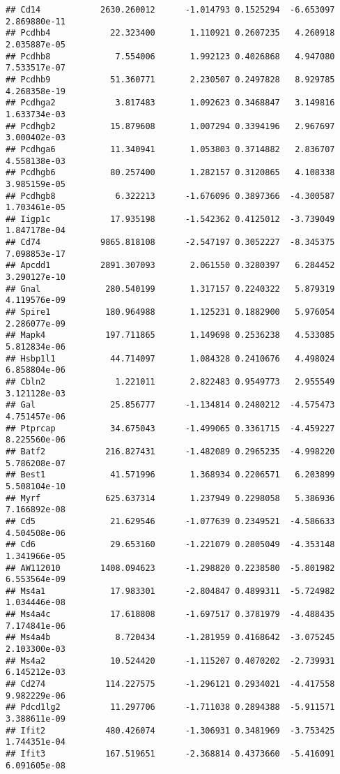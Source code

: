 \documentclass[
]{article}
\begin{document}
\begin{verbatim}
## Cd14            2630.260012      -1.014793 0.1525294  -6.653097 2.869880e-11
## Pcdhb4            22.323400       1.110921 0.2607235   4.260918 2.035887e-05
## Pcdhb8             7.554006       1.992123 0.4026868   4.947080 7.533517e-07
## Pcdhb9            51.360771       2.230507 0.2497828   8.929785 4.268358e-19
## Pcdhga2            3.817483       1.092623 0.3468847   3.149816 1.633734e-03
## Pcdhgb2           15.879608       1.007294 0.3394196   2.967697 3.000402e-03
## Pcdhga6           11.340941       1.053803 0.3714882   2.836707 4.558138e-03
## Pcdhgb6           80.257400       1.282157 0.3120865   4.108338 3.985159e-05
## Pcdhgb8            6.322213      -1.676096 0.3897366  -4.300587 1.703461e-05
## Iigp1c            17.935198      -1.542362 0.4125012  -3.739049 1.847178e-04
## Cd74            9865.818108      -2.547197 0.3052227  -8.345375 7.098853e-17
## Apcdd1          2891.307093       2.061550 0.3280397   6.284452 3.290127e-10
## Gnal             280.540199       1.317157 0.2240322   5.879319 4.119576e-09
## Spire1           180.964988       1.125231 0.1882900   5.976054 2.286077e-09
## Mapk4            197.711865       1.149698 0.2536238   4.533085 5.812834e-06
## Hsbp1l1           44.714097       1.084328 0.2410676   4.498024 6.858804e-06
## Cbln2              1.221011       2.822483 0.9549773   2.955549 3.121128e-03
## Gal               25.856777      -1.134814 0.2480212  -4.575473 4.751457e-06
## Ptprcap           34.675043      -1.499065 0.3361715  -4.459227 8.225560e-06
## Batf2            216.827431      -1.482089 0.2965235  -4.998220 5.786208e-07
## Best1             41.571996       1.368934 0.2206571   6.203899 5.508104e-10
## Myrf             625.637314       1.237949 0.2298058   5.386936 7.166892e-08
## Cd5               21.629546      -1.077639 0.2349521  -4.586633 4.504508e-06
## Cd6               29.653160      -1.221079 0.2805049  -4.353148 1.341966e-05
## AW112010        1408.094623      -1.298820 0.2238580  -5.801982 6.553564e-09
## Ms4a1             17.983301      -2.804847 0.4899311  -5.724982 1.034446e-08
## Ms4a4c            17.618808      -1.697517 0.3781979  -4.488435 7.174841e-06
## Ms4a4b             8.720434      -1.281959 0.4168642  -3.075245 2.103300e-03
## Ms4a2             10.524420      -1.115207 0.4070202  -2.739931 6.145212e-03
## Cd274            114.227575      -1.296121 0.2934021  -4.417558 9.982229e-06
## Pdcd1lg2          11.297706      -1.711038 0.2894388  -5.911571 3.388611e-09
## Ifit2            480.426074      -1.306931 0.3481969  -3.753425 1.744351e-04
## Ifit3            167.519651      -2.368814 0.4373660  -5.416091 6.091605e-08

\end{verbatim}
\end{document}
